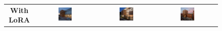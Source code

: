 \begin{figure}[H]
  \centering
  {\footnotesize
  \renewcommand{\arraystretch}{1.1}
  \setlength{\tabcolsep}{4pt}
  \begin{tabular}{c c c c}
    \textbf{With LoRA} &
    \includegraphics[width=0.25\textwidth]{Images/Results/Architect-B_unstructured-phase/generated_images/3/Met_lora_00010_.png} &
    \includegraphics[width=0.25\textwidth]{Images/Results/Architect-B_unstructured-phase/generated_images/3/Met_lora_00012_.png} &
    \includegraphics[width=0.25\textwidth]{Images/Results/Architect-B_unstructured-phase/generated_images/3/Met_lora_00019_.png} \\


\end{tabular}}
\end{figure}
